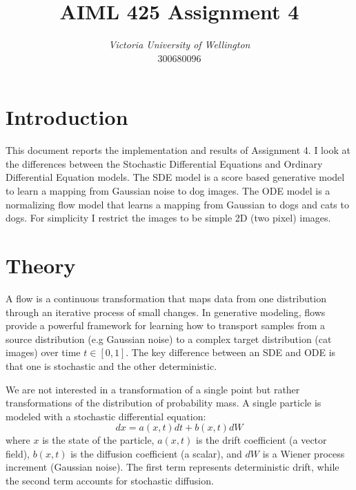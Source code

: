 \documentclass[conference,a4paper]{IEEEtran}
\begin{document}
\title{AIML 425 Assignment 4 %
}

\author{
\textit{Victoria University of Wellington}\\
300680096}


\maketitle

\section{Introduction}

This document reports the implementation and results of Assignment 4. I look at the differences between the Stochastic Differential Equations and Ordinary Differential Equation models. The SDE model is a score based generative model to learn a mapping from Gaussian noise to dog images. The ODE model is a normalizing flow model that learns a mapping from Gaussian to dogs and cats to dogs. For simplicity I restrict the images to be simple 2D (two pixel) images.

\section{Theory}

A flow is a continuous transformation that maps data from one distribution through an iterative process of small changes. In generative modeling, flows provide a powerful framework for learning how to transport samples from a source distribution (e.g Gaussian noise) to a complex target distribution (cat images) over time $t \in [0, 1]$. The key difference between an SDE and ODE is that one is stochastic and the other deterministic.

We are not interested in a transformation of a single point but rather transformations of the distribution of probability mass. A single particle is modeled with a stochastic differential equation:
\begin{equation}
    \label{eq:sde_particle}
    dx = a(x, t)dt + b(x, t)dW
\end{equation}
where $x$ is the state of the particle, $a(x, t)$ is the drift coefficient (a vector field), $b(x, t)$ is the diffusion coefficient (a scalar), and $dW$ is a Wiener process increment (Gaussian noise). The first term represents deterministic drift, while the second term accounts for stochastic diffusion.
\end{document}
